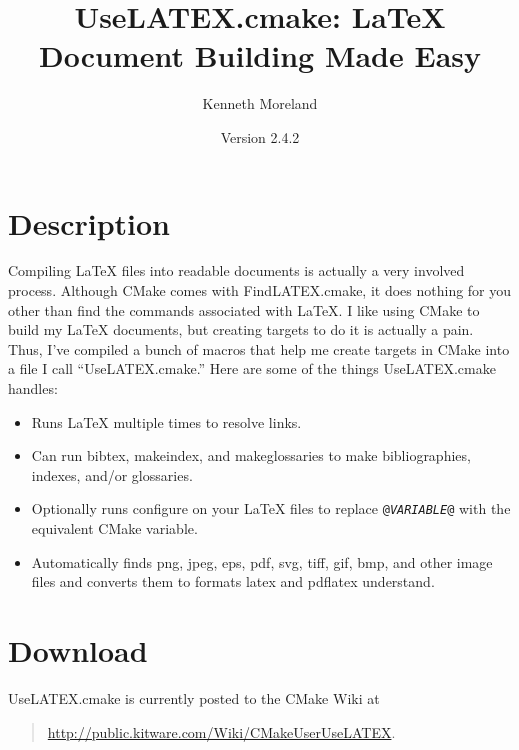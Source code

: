 \documentclass{article}
\newcommand{\UseLATEXVersion}{2.4.2}
\newcommand*{\textfile}[1]{\textsf{#1}}
\newcommand*{\textprog}[1]{\textfile{#1}}
\newcommand*{\textcmake}[1]{\texttt{#1}}
\newcommand*{\textvar}[1]{\textit{#1}}
\newcommand*{\UseLATEX}{\textfile{UseLATEX.cmake}\xspace}
\newcommand*{\latex}{\LaTeX\xspace}
\begin{document}
  \sloppy

  \title{UseLATEX.cmake: \latex Document Building Made Easy}
  \author{Kenneth Moreland}
  \date{Version \UseLATEXVersion}
  \maketitle

  \tableofcontents


  \section{Description}
  \label{sec:Description}

  Compiling \latex files into readable documents is actually a very
  involved process. Although CMake comes with \textfile{FindLATEX.cmake},
  it does nothing for you other than find the commands associated with
  \latex. I like using CMake to build my \latex documents, but creating
  targets to do it is actually a pain. Thus, I've compiled a bunch of
  macros that help me create targets in CMake into a file I call
  ``\UseLATEX.'' Here are some of the things \UseLATEX handles:

  \begin{itemize}
  \item Runs \latex multiple times to resolve links.
  \item Can run \textprog{bibtex}, \textprog{makeindex}, and
    \textprog{makeglossaries} to make bibliographies, indexes, and/or
    glossaries.
  \item Optionally runs configure on your \latex files to replace
    \textcmake{@\textvar{VARIABLE}@} with the equivalent CMake variable.
  \item Automatically finds png, jpeg, eps, pdf, svg, tiff, gif, bmp, and
    other image files and converts them to formats \textprog{latex} and
    \textprog{pdflatex} understand.
  \end{itemize}


  \section{Download}
  \label{sec:Download}

  \UseLATEX is currently posted to the CMake Wiki at
  \begin{quote}
    \href{http://public.kitware.com/Wiki/CMakeUserUseLATEX}{http://public.kitware.com/Wiki/CMakeUserUseLATEX}.
  \end{quote}
\end{document}
